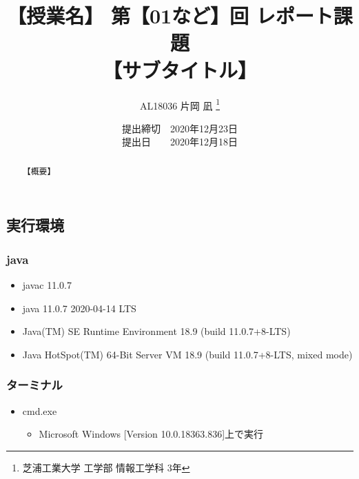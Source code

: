 \documentclass[a4paper, papersize]{jsarticle}
\title{
\vspace{-2cm} %
【授業名】 第【01など】回 レポート課題 \\
【サブタイトル】}
\author{AL18036 片岡 凪 \thanks{芝浦工業大学 工学部 情報工学科 3年}}
\date{提出締切　2020年12月23日 \\
提出日　　2020年12月18日}
\begin{document}
\maketitle


\setcounter{tocdepth}{2}
\tableofcontents
\newpage


\begin{abstract}
  【概要】
\end{abstract}


\begin{multicols}{2}
  \setcounter{section}{-1}


  \section{実行環境}
  \subsubsection{java}
  \begin{itemize}
    \item javac 11.0.7
    \item java 11.0.7 2020-04-14 LTS
    \item Java(TM) SE Runtime Environment 18.9 (build 11.0.7+8-LTS)
    \item Java HotSpot(TM) 64-Bit Server VM 18.9 (build 11.0.7+8-LTS, mixed mode)
  \end{itemize}


  \subsubsection{ターミナル}
  \begin{itemize}
    \item cmd.exe
          \begin{itemize}
            \item Microsoft Windows [Version 10.0.18363.836]上で実行
          \end{itemize}
  \end{itemize}


\end{multicols}
\end{document}
